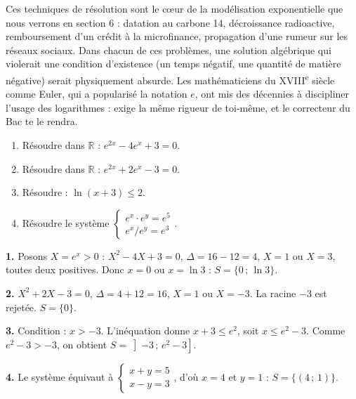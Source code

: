 \documentclass[11pt]{article}
\begin{document}
\begin{savaistu}
Ces techniques de résolution sont le cœur de la modélisation exponentielle que nous verrons en section 6 : datation au carbone 14, décroissance radioactive, remboursement d'un crédit à la microfinance, propagation d'une rumeur sur les réseaux sociaux. Dans chacun de ces problèmes, une solution algébrique qui violerait une condition d'existence (un temps négatif, une quantité de matière négative) serait physiquement absurde. Les mathématiciens du XVIII\textsuperscript{e} siècle comme Euler, qui a popularisé la notation $e$, ont mis des décennies à discipliner l'usage des logarithmes : exige la même rigueur de toi-même, et le correcteur du Bac te le rendra.
\end{savaistu}

\begin{exercice}
\begin{enumerate}
\item Résoudre dans $\mathbb{R}$ : $e^{2x} - 4e^x + 3 = 0$.
\item Résoudre dans $\mathbb{R}$ : $e^{2x} + 2e^x - 3 = 0$.
\item Résoudre : $\ln(x+3) \leq 2$.
\item Résoudre le système $\begin{cases} e^x \cdot e^y = e^5 \\ e^x / e^y = e^3 \end{cases}$.
\end{enumerate}
\end{exercice}

\begin{corrige}
\textbf{1.} Posons $X = e^x > 0$ : $X^2 - 4X + 3 = 0$, $\Delta = 16 - 12 = 4$, $X = 1$ ou $X = 3$, toutes deux positives. Donc $x = 0$ ou $x = \ln 3$ : $S = \lbrace 0\,;\,\ln 3\rbrace$.

\textbf{2.} $X^2 + 2X - 3 = 0$, $\Delta = 4 + 12 = 16$, $X = 1$ ou $X = -3$. La racine $-3$ est rejetée. $S = \lbrace 0 \rbrace$.

\textbf{3.} Condition : $x > -3$. L'inéquation donne $x + 3 \leq e^2$, soit $x \leq e^2 - 3$. Comme $e^2 - 3 > -3$, on obtient $S = \left]-3\,;\,e^2 - 3\right]$.

\textbf{4.} Le système équivaut à $\begin{cases} x + y = 5 \\ x - y = 3 \end{cases}$, d'où $x = 4$ et $y = 1$ : $S = \lbrace (4\,;\,1)\rbrace$.
\end{corrige}
\end{document}
